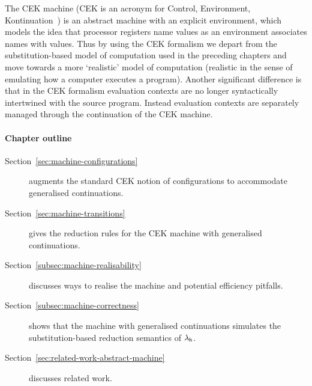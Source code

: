 \documentclass[12pt,phd,lfcs,twoside,openright,logo,leftchapter,normalheadings]{infthesis}
\theoremstyle{plain}
\theoremstyle{definition}
\begin{document}
The CEK machine (CEK is an acronym for Control, Environment,
Kontinuation~\cite{FelleisenF86}) is an abstract machine with an
explicit environment, which models the idea that processor registers
name values as an environment associates names with values. Thus by
using the CEK formalism we depart from the substitution-based model of
computation used in the preceding chapters and move towards a more
`realistic' model of computation (realistic in the sense of emulating
how a computer executes a program). Another significant difference is
that in the CEK formalism evaluation contexts are no longer
syntactically intertwined with the source program. Instead evaluation
contexts are separately managed through the continuation of the CEK
machine.


\paragraph{Chapter outline}
\begin{description}
\item[Section~\ref{sec:machine-configurations}] augments the standard
  CEK notion of configurations to accommodate generalised
  continuations.
\item[Section~\ref{sec:machine-transitions}] gives the reduction rules for the CEK
  machine with generalised continuations.
\item[Section~\ref{subsec:machine-realisability}] discusses ways to
  realise the machine and potential efficiency pitfalls.
\item[Section~\ref{subsec:machine-correctness}] shows that the machine with generalised
  continuations simulates the substitution-based reduction semantics
  of $\lambda_{\mathsf{h}}$.
\item[Section~\ref{sec:related-work-abstract-machine}] discusses related work.
\end{description}
\end{document}
